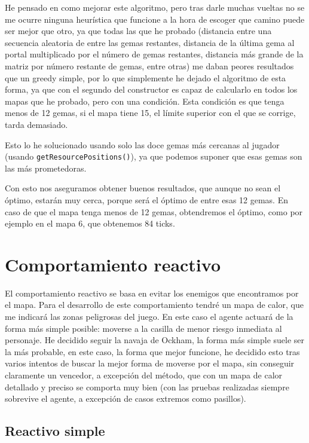 \documentclass[10pt, spanish]{article}
\begin{document}
He pensado en como mejorar este algoritmo, pero tras darle muchas vueltas no se me ocurre ninguna heurística que funcione a la hora de escoger que camino puede ser mejor que otro, ya que todas las que he probado (distancia entre una secuencia aleatoria de entre las gemas restantes, distancia de la última gema al portal multiplicado por el número de gemas restantes, distancia más grande de la matriz por número restante de gemas, entre otras) me daban peores resultados que un greedy simple, por lo que simplemente he dejado el algoritmo de esta forma, ya que con el segundo del constructor es capaz de calcularlo en todos los mapas que he probado, pero con una condición. Esta condición es que tenga menos de 12 gemas, si el mapa tiene 15, el límite superior con el que se corrige, tarda demasiado.

Esto lo he solucionado usando solo las doce gemas más cercanas al jugador (usando \texttt{getResourcePositions()}), ya que podemos suponer que esas gemas son las más prometedoras.

Con esto nos aseguramos obtener buenos resultados, que aunque no sean el óptimo, estarán muy cerca, porque será el óptimo de entre esas 12 gemas. En caso de que el mapa tenga menos de 12 gemas, obtendremos el óptimo, como por ejemplo en el mapa 6, que obtenemos 84 ticks.

\section{Comportamiento reactivo}

El comportamiento reactivo se basa en evitar los enemigos que encontramos por el mapa. Para el desarrollo de este comportamiento tendré un mapa de calor, que me indicará las zonas peligrosas del juego. En este caso el agente actuará de la forma más simple posible: moverse a la casilla de menor riesgo inmediata al personaje. He decidido seguir la navaja de Ockham, la forma más simple suele ser la más probable, en este caso, la forma que mejor funcione, he decidido esto tras varios intentos de buscar la mejor forma de moverse por el mapa, sin conseguir claramente un vencedor, a excepción del método, que con un mapa de calor detallado y preciso se comporta muy bien (con las pruebas realizadas siempre sobrevive el agente, a excepción de casos extremos como pasillos).

\subsection{Reactivo simple}
\end{document}
